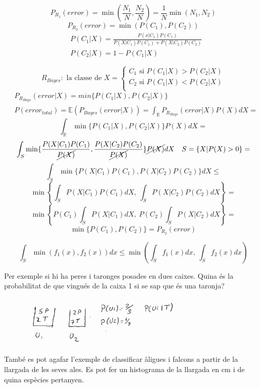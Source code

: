 \documentclass[a4paper]{article}
\begin{document}
$$
P_{R_1} (error) = \min\left(\frac{N_1}{N}, \frac{N_2}{N}\right) = \frac{1}{N} \min(N_1, N_2)
$$
$$
P_{R_2} (error) = \min(P(C_1), P(C_2))
$$
\begin{align*}
	& P(C_1 | X) = \frac{P(x|C_1)P(C_1)}{P(X|C_1)P(C_1) + P(X|C_2)P(C_2)} \\
	& P(C_2|X) = 1 - P(C_1|X)
\end{align*}

$$
R_{Bayes}: \text{ la classe de } X =
\begin{cases}
C_1 \text{ si } P(C_1|X) > P(C_2|X) \\
C_2 \text{ si } P(C_1|X) < P(C_2|X) \\
\end{cases}
$$
\begin{align*}
&P_{R_{Bays}} (error|X) = min\{P(C_1|X), P(C_2|X)\} \\
&P(error_{total}) = \mathbb{E}(P_{Bayes} (error|X)) = 
\int_{\mathbb{R}} P_{R_{Bays}} (error|X)P(X)dX =
\end{align*}
$$
\int_{\mathbb{R}} \min\{P(C_1|X),P(C_2|X)\}P(X)dX =
$$
$$
\int_{S} \min\{\frac{P(X|C_1)P(C_1)}{\cancel{P(X)}}, \frac{P(X|C_2)P(C_2)}{\cancel{P(X)}}\}\cancel{P(X)} dX \quad S = \{X|P(X) > 0\} =
$$
$$
\int_S \min\{ P(X|C_1)P(C_1), P(X|C_2)P(C_2) \} dX \le
$$
$$
\min\left\{ \int_S P(X|C_1)P(C_1) dX,\ \int_S P(X|C_2)P(C_2)dX \right\} =
$$
$$
\min\left\{ P(C_1)\int_S P(X|C_1)dX,\ P(C_2)\int_S P(X|C_2)dX \right\} =
$$
$$
\min \{ P(C_1), P(C_2) \} = P_{R_2} (error)
$$

$$
\int_S \min(f_1(x), f_2(x)) dx \le \min\left( \int_S f_1(x) dx,\ \int_S f_2(x) dx \right)
$$

Per exemple si hi ha peres i taronges posades en dues caixes. Quina és la probabilitat de que vingués de la caixa 1 si se sap que és una taronja?

\begin{figure}[H]
	\centering
	\includegraphics[width=0.7\textwidth]{images/tema_5-3}
\end{figure}

També es pot agafar l'exemple de classificar àligues i falcons a partir de la llargada de les seves ales. Es pot fer un histograma de la llargada en cm i de quina espècies pertanyen.
\end{document}
